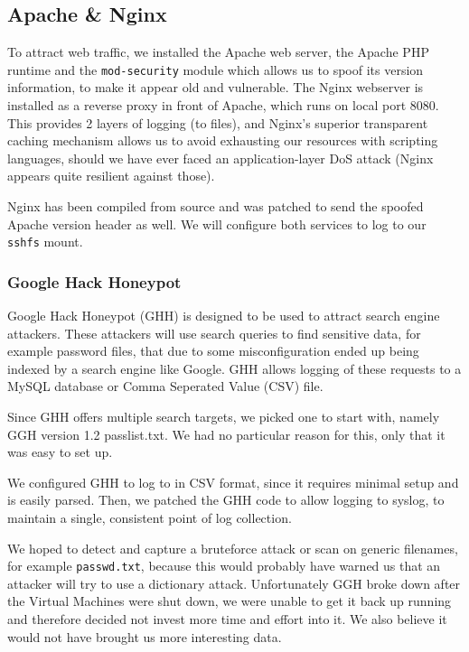 \documentclass[11pt]{article}
\begin{document}

\subsection{Apache \& Nginx}
To attract web traffic, we installed the Apache web server, the Apache PHP runtime and the \verb|mod-security| module which allows us to spoof its version information, to make it appear old and vulnerable.
The Nginx webserver is installed as a reverse proxy in front of Apache, which runs on local port 8080.
This provides 2 layers of logging (to files), and Nginx's superior transparent caching mechanism allows us to avoid exhausting our resources with scripting languages, should we have ever faced an application-layer DoS attack (Nginx appears quite resilient against those).

Nginx has been compiled from source and was patched to send the spoofed Apache version header as well.
We will configure both services to log to our \verb|sshfs| mount.

\subsubsection{Google Hack Honeypot}
Google Hack Honeypot (GHH) is designed to be used to attract search engine attackers. 
These attackers will use search queries to find sensitive data, for example password files, that due to some misconfiguration ended up being indexed by a search engine like Google.
GHH allows logging of these requests to a MySQL database or Comma Seperated Value (CSV) file.

Since GHH offers multiple search targets, we picked one to start with, namely GGH version 1.2 passlist.txt.
We had no particular reason for this, only that it was easy to set up. 

We configured GHH to log to in CSV format, since it requires minimal setup and is easily parsed.
Then, we patched the GHH code to allow logging to syslog, to maintain a single, consistent point of log collection.

We hoped to detect and capture a bruteforce attack or scan on generic filenames, for example \verb|passwd.txt|, because this would probably have warned us that an attacker will try to use a dictionary attack.
Unfortunately GGH broke down after the Virtual Machines were shut down, we were unable to get it back up running and therefore decided not invest more time and effort into it. We also believe it would not have brought us more interesting data.
\end{document}

